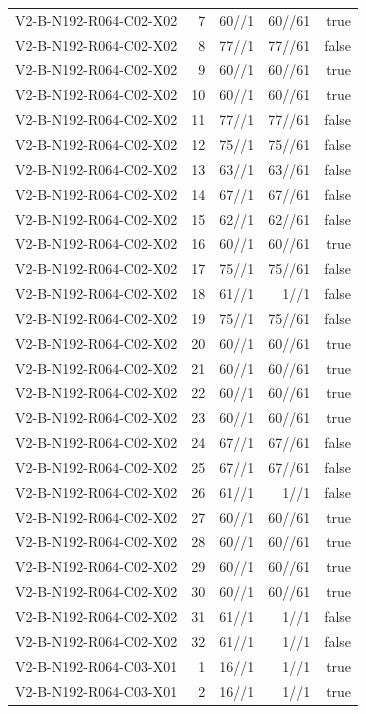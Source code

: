 {\begin{longtable}{lrrrr}
V2-B-N192-R064-C02-X02 & 7 & 60//1 & 60//61 & true \\
V2-B-N192-R064-C02-X02 & 8 & 77//1 & 77//61 & false \\
V2-B-N192-R064-C02-X02 & 9 & 60//1 & 60//61 & true \\
V2-B-N192-R064-C02-X02 & 10 & 60//1 & 60//61 & true \\
V2-B-N192-R064-C02-X02 & 11 & 77//1 & 77//61 & false \\
V2-B-N192-R064-C02-X02 & 12 & 75//1 & 75//61 & false \\
V2-B-N192-R064-C02-X02 & 13 & 63//1 & 63//61 & false \\
V2-B-N192-R064-C02-X02 & 14 & 67//1 & 67//61 & false \\
V2-B-N192-R064-C02-X02 & 15 & 62//1 & 62//61 & false \\
V2-B-N192-R064-C02-X02 & 16 & 60//1 & 60//61 & true \\
V2-B-N192-R064-C02-X02 & 17 & 75//1 & 75//61 & false \\
V2-B-N192-R064-C02-X02 & 18 & 61//1 & 1//1 & false \\
V2-B-N192-R064-C02-X02 & 19 & 75//1 & 75//61 & false \\
V2-B-N192-R064-C02-X02 & 20 & 60//1 & 60//61 & true \\
V2-B-N192-R064-C02-X02 & 21 & 60//1 & 60//61 & true \\
V2-B-N192-R064-C02-X02 & 22 & 60//1 & 60//61 & true \\
V2-B-N192-R064-C02-X02 & 23 & 60//1 & 60//61 & true \\
V2-B-N192-R064-C02-X02 & 24 & 67//1 & 67//61 & false \\
V2-B-N192-R064-C02-X02 & 25 & 67//1 & 67//61 & false \\
V2-B-N192-R064-C02-X02 & 26 & 61//1 & 1//1 & false \\
V2-B-N192-R064-C02-X02 & 27 & 60//1 & 60//61 & true \\
V2-B-N192-R064-C02-X02 & 28 & 60//1 & 60//61 & true \\
V2-B-N192-R064-C02-X02 & 29 & 60//1 & 60//61 & true \\
V2-B-N192-R064-C02-X02 & 30 & 60//1 & 60//61 & true \\
V2-B-N192-R064-C02-X02 & 31 & 61//1 & 1//1 & false \\
V2-B-N192-R064-C02-X02 & 32 & 61//1 & 1//1 & false \\
V2-B-N192-R064-C03-X01 & 1 & 16//1 & 1//1 & true \\
V2-B-N192-R064-C03-X01 & 2 & 16//1 & 1//1 & true \\

\end{longtable}}
